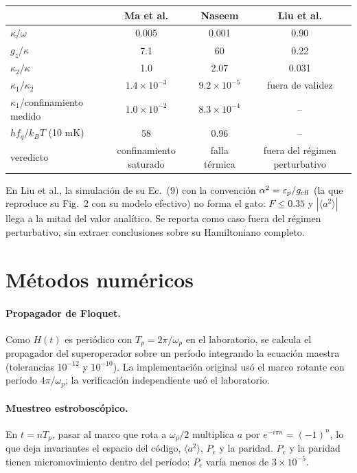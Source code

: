 \documentclass[11pt]{report}
\begin{document}
\begin{table}[h]
\centering
\begin{tabular}{lccc}
\toprule
 & Ma et al. & Naseem & Liu et al.\\
\midrule
$\kappa/\omega$ & 0.005 & 0.001 & 0.90\\
$g_{z}/\kappa$ & 7.1 & 60 & 0.22\\
$\kappa_{2}/\kappa$ & 1.0 & 2.07 & 0.031\\
$\kappa_{1}/\kappa_{2}$ & $1.4\times10^{-3}$ & $9.2\times10^{-5}$ & fuera de validez\\
$\kappa_{1}$/confinamiento medido & $1.0\times10^{-2}$ & $8.3\times10^{-4}$ & --\\
$hf_{q}/k_{B}T$ (10 mK) & 58 & 0.96 & --\\
veredicto & confinamiento saturado & falla t\'ermica & fuera del r\'egimen perturbativo\\
\bottomrule
\end{tabular}
\end{table}

En Liu et al., la simulaci\'on de su Ec.~(9) con la convenci\'on $\alpha^{2}=\varepsilon_{p}/g_{\rm eff}$ (la que reproduce su Fig.~2 con su modelo efectivo) no forma el gato: $F\leq0.35$ y $|\langle a^{2}\rangle|$ llega a la mitad del valor anal\'itico. Se reporta como caso fuera del r\'egimen perturbativo, sin extraer conclusiones sobre su Hamiltoniano completo.

\section{M\'etodos num\'ericos}

\paragraph{Propagador de Floquet.} Como $H(t)$ es peri\'odico con $T_{p}=2\pi/\omega_{p}$ en el laboratorio, se calcula el propagador del superoperador sobre un per\'iodo integrando la ecuaci\'on maestra (tolerancias $10^{-12}$ y $10^{-10}$). La implementaci\'on original us\'o el marco rotante con per\'iodo $4\pi/\omega_{p}$; la verificaci\'on independiente us\'o el laboratorio.

\paragraph{Muestreo estrobosc\'opico.} En $t=nT_{p}$, pasar al marco que rota a $\omega_{p}/2$ multiplica $a$ por $e^{-i\pi n}=(-1)^{n}$, lo que deja invariantes el espacio del c\'odigo, $\langle a^{2}\rangle$, $P_{e}$ y la paridad. $P_{e}$ y la paridad tienen micromovimiento dentro del per\'iodo; $P_{c}$ var\'ia menos de $3\times10^{-5}$.
\end{document}
